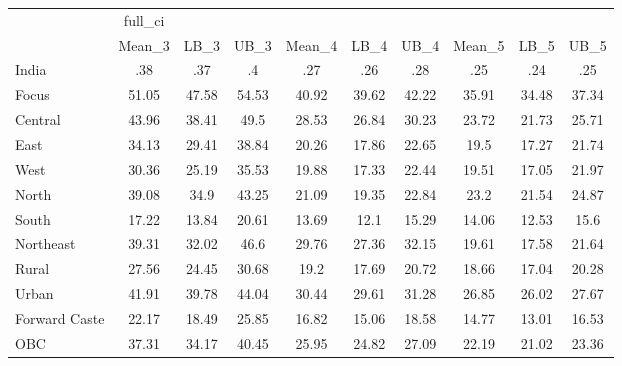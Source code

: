\begin{tabular}{l*{9}{c}}
\toprule
                    &     full\_ci&            &            &            &            &            &            &            &            \\
                    &      Mean\_3&        LB\_3&        UB\_3&      Mean\_4&        LB\_4&        UB\_4&      Mean\_5&        LB\_5&        UB\_5\\
\midrule
India               &         .38&         .37&          .4&         .27&         .26&         .28&         .25&         .24&         .25\\
Focus               &       51.05&       47.58&       54.53&       40.92&       39.62&       42.22&       35.91&       34.48&       37.34\\
Central             &       43.96&       38.41&        49.5&       28.53&       26.84&       30.23&       23.72&       21.73&       25.71\\
East                &       34.13&       29.41&       38.84&       20.26&       17.86&       22.65&        19.5&       17.27&       21.74\\
West                &       30.36&       25.19&       35.53&       19.88&       17.33&       22.44&       19.51&       17.05&       21.97\\
North               &       39.08&        34.9&       43.25&       21.09&       19.35&       22.84&        23.2&       21.54&       24.87\\
South               &       17.22&       13.84&       20.61&       13.69&        12.1&       15.29&       14.06&       12.53&        15.6\\
Northeast           &       39.31&       32.02&        46.6&       29.76&       27.36&       32.15&       19.61&       17.58&       21.64\\
Rural               &       27.56&       24.45&       30.68&        19.2&       17.69&       20.72&       18.66&       17.04&       20.28\\
Urban               &       41.91&       39.78&       44.04&       30.44&       29.61&       31.28&       26.85&       26.02&       27.67\\
Forward Caste       &       22.17&       18.49&       25.85&       16.82&       15.06&       18.58&       14.77&       13.01&       16.53\\
OBC                 &       37.31&       34.17&       40.45&       25.95&       24.82&       27.09&       22.19&       21.02&       23.36\\

\end{tabular}
